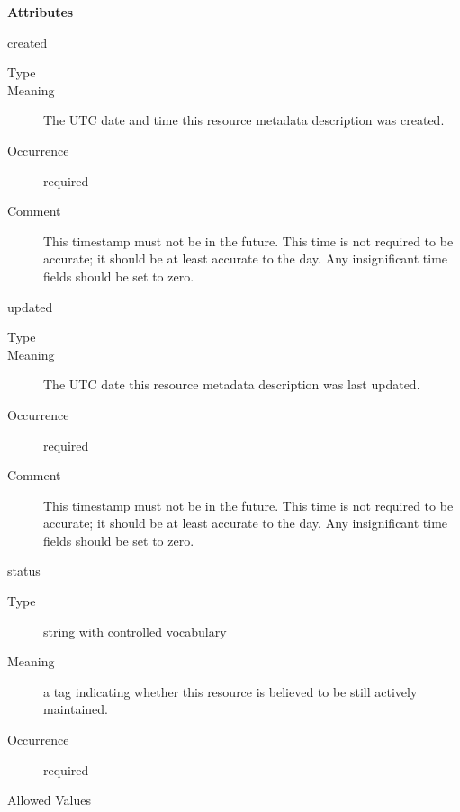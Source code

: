 \documentclass[11pt,a4paper]{ivoa}
\begin{document}
\begin{generated}
\vspace{0.5ex}\noindent\textbf{ Attributes}

\begingroup\small\begin{bigdescription}
\item[created]
\begin{description}
\item[Type] 
\item[Meaning] 
              The UTC date and time this resource metadata description
              was created. 
            
\item[Occurrence] required
\item[Comment] 
              This timestamp must not be in the future.  This time is
              not required to be accurate; it should be at least
              accurate to the day.  Any insignificant time fields
              should be set to zero. 
            
\end{description}
\item[updated]
\begin{description}
\item[Type] 
\item[Meaning] 
              The UTC date this resource metadata description was last updated.
            
\item[Occurrence] required
\item[Comment] 
              This timestamp must not be in the future.  This time is
              not required to be accurate; it should be at least
              accurate to the day.  Any insignificant time fields
              should be set to zero. 
            
\end{description}
\item[status]
\begin{description}
\item[Type] string with controlled vocabulary
\item[Meaning] 
              a tag indicating whether this resource is believed to be still
              actively maintained.
            
\item[Occurrence] required

\item[Allowed Values]\hfil
{}
\end{description}
\end{bigdescription}
\end{generated}
\end{document}
